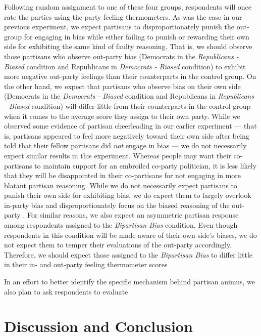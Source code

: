 \documentclass[12pt, letterpaper]{article}
\begin{document}
{Following random assignment to one of these four groups, respondents will once rate the parties using the party feeling thermometers. As was the case in our previous experiment, we expect partisans to disproportionately punish the out-group for engaging in bias while either failing to punish or rewarding their own side for exhibiting the same kind of faulty reasoning. That is, we should observe those partisans who observe out-party bias (Democrats in the \textit{Republicans - Biased} condition and Republicans in \textit{Democrats - Biased} condition) to exhibit more negative out-party feelings than their counterparts in the control group. On the other hand, we expect that partisans who observe bias on their own side (Democrats in the \textit{Democrats - Biased} condition and Republicans in \textit{Republicans - Biased} condition) will differ little from their counterparts in the control group when it comes to the average score they assign to their own party. While we observed some evidence of partisan cheerleading in our earlier experiment --- that is, partisans appeared to feel more negatively toward their own side after being told that their fellow partisans did \textit{not} engage in bias --- we do not necessarily expect similar results in this experiment. Whereas people may want their co-partisans to maintain support for an embroiled co-party politician, it is less likely that they will be disappointed in their co-partisans for not engaging in more blatant partisan reasoning. While we do not necessarily expect partisans to punish their own side for exhibiting bias, we do expect them to largely overlook in-party bias and disproportionately focus on the biased reasoning of the out-party \citep{proninetal_2002,pronin_2007}. For similar reasons, we also expect an asymmetric partisan response among respondents assigned to the \textit{Bipartisan Bias} condition. Even though respondents in this condition will be made aware of their own side's biases, we do not expect them to temper their evaluations of the out-party accordingly. Therefore, we should expect those assigned to the \textit{Bipartisan Bias} to differ little in their in- and out-party feeling thermometer scores 

In an effort to better identify the specific mechanism behind partisan animus, we also plan to ask respondents to evaluate 

\section*{Discussion and Conclusion}

}
\end{document}
